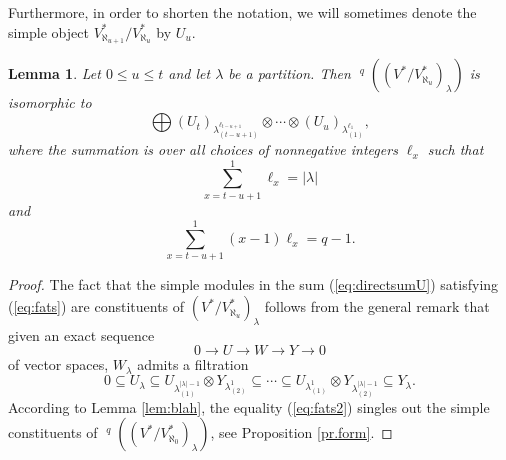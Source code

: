 \documentclass[11pt]{article}
\theoremstyle{plain}
\newtheorem{lemma}{Lemma}[section]
\theoremstyle{nonumberplain}
\theoremstyle{plain}
\theoremstyle{nonumberplain}
\newtheorem{proof}{Proof}
\newcommand\al{\aleph}
\DeclareMathOperator{\ext}{\mathrm{Ext}}
\DeclareMathOperator{\soc}{\mathrm{soc}}
\DeclareMathOperator{\usoc}{\underline{\mathrm{soc}}}
\begin{document}
Furthermore, in order to shorten the notation, we will sometimes denote the simple object $V^*_{\al_{u+1}}/V^*_{\al_u}$ by $U_u$.  




\begin{lemma}\label{le.quot_filt}
  Let $0\leq u\le t$ and let $\lambda$ be a partition. Then $\usoc^q\left((V^*/V^*_{\al_u})_\lambda\right)$
  is isomorphic to
  \begin{equation}\label{eq:directsumU}
    \bigoplus (U_t)_{\lambda_{(t-u+1)}^{\ell_{t-u+1}}}\otimes\cdots\otimes (U_u)_{\lambda_{(1)}^{\ell_1}},
  \end{equation}
where the summation is over all choices of nonnegative integers $\ell_x$ such that
\begin{equation}\label{eq:fats}
  \sum^{1}_{x=t-u+1}\ell_x=|\lambda|
\end{equation} 
and
\begin{equation}\label{eq:fats2}
\sum^{1}_{x=t-u+1}(x-1)\ell_x=q-1.
\end{equation}
\end{lemma}
\begin{proof}
  The fact that the simple modules in the sum (\ref{eq:directsumU}) satisfying (\ref{eq:fats}) are constituents of $\left(V^*/V^*_{\aleph_u}\right)_\lambda$ follows from the general remark that given an exact sequence
  \begin{equation*}
    0\to U\to W\to Y\to 0
  \end{equation*}
  of vector spaces, $W_\lambda$ admits a filtration
  \begin{equation*}
    0\subseteq U_\lambda \subseteq U_{\lambda^{|\lambda|-1}_{(1)}}\otimes Y_{\lambda^{1}_{(2)}} \subseteq\cdots\subseteq U_{\lambda^1_{(1)}}\otimes Y_{\lambda^{|\lambda|-1}_{(2)}} \subseteq Y_\lambda. 
  \end{equation*}
	According to Lemma \ref{lem:blah}, the equality (\ref{eq:fats2}) singles out the simple constituents of $\usoc^q\left((V^*/V^*_{\aleph_0})_\lambda\right)$, see Proposition \ref{pr.form}.
%
\end{proof}
\end{document}
